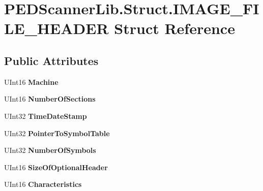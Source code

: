 \hypertarget{struct_p_e_d_scanner_lib_1_1_struct_1_1_i_m_a_g_e___f_i_l_e___h_e_a_d_e_r}{}\section{P\+E\+D\+Scanner\+Lib.\+Struct.\+I\+M\+A\+G\+E\+\_\+\+F\+I\+L\+E\+\_\+\+H\+E\+A\+D\+ER Struct Reference}
\label{struct_p_e_d_scanner_lib_1_1_struct_1_1_i_m_a_g_e___f_i_l_e___h_e_a_d_e_r}
\subsection*{Public Attributes}
\begin{DoxyCompactItemize}
\item 
\mbox{\label{struct_p_e_d_scanner_lib_1_1_struct_1_1_i_m_a_g_e___f_i_l_e___h_e_a_d_e_r_a1da52d9b7f2cc3ab26aec5ba95d47e56}} 
U\+Int16 {\bfseries Machine}
\item 
\mbox{\label{struct_p_e_d_scanner_lib_1_1_struct_1_1_i_m_a_g_e___f_i_l_e___h_e_a_d_e_r_afb170aad2439c4648e95d959a3cda816}} 
U\+Int16 {\bfseries Number\+Of\+Sections}
\item 
\mbox{\label{struct_p_e_d_scanner_lib_1_1_struct_1_1_i_m_a_g_e___f_i_l_e___h_e_a_d_e_r_a635595bc92db9ca9b7f3bd0904b434cd}} 
U\+Int32 {\bfseries Time\+Date\+Stamp}
\item 
\mbox{\label{struct_p_e_d_scanner_lib_1_1_struct_1_1_i_m_a_g_e___f_i_l_e___h_e_a_d_e_r_a3575de2b61fc6ff18e5559d667246cb2}} 
U\+Int32 {\bfseries Pointer\+To\+Symbol\+Table}
\item 
\mbox{\label{struct_p_e_d_scanner_lib_1_1_struct_1_1_i_m_a_g_e___f_i_l_e___h_e_a_d_e_r_a4d3554265f629d209e383e4295634bb9}} 
U\+Int32 {\bfseries Number\+Of\+Symbols}
\item 
\mbox{\label{struct_p_e_d_scanner_lib_1_1_struct_1_1_i_m_a_g_e___f_i_l_e___h_e_a_d_e_r_a09da0aaa9db95fb2b995954d95472e1c}} 
U\+Int16 {\bfseries Size\+Of\+Optional\+Header}
\item 
\mbox{\label{struct_p_e_d_scanner_lib_1_1_struct_1_1_i_m_a_g_e___f_i_l_e___h_e_a_d_e_r_acbcad9556719d5c29878619e3c89ecc7}} 
U\+Int16 {\bfseries Characteristics}
\end{DoxyCompactItemize}


